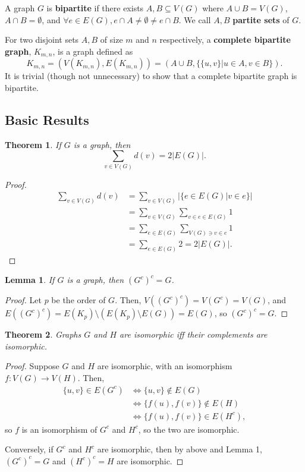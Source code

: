 \documentclass[a4paper,12pt]{article}
\newtheorem{theorem}{Theorem}
\newtheorem{lemma}{Lemma}
\begin{document}
A graph $G$ is {\bf bipartite} if there exists $A, B \subseteq V(G)$ where
$A \cup B = V(G)$, $A \cap B = \emptyset$, and
$\forall e \in E(G), e \cap A \neq \emptyset \neq e \cap B$.
We call $A, B$ {\bf partite sets} of $G$.

For two disjoint sets $A, B$ of size $m$ and $n$ respectively,
a {\bf complete bipartite graph}, $K_{m,n}$, is a graph defined as
\[ K_{m,n} = (V(K_{m,n}), E(K_{m,n})) = (A \cup B, \{\{u, v\} | u \in A, v \in B\}).\]
It is trivial (though not unnecessary)
to show that a complete bipartite graph is bipartite.

\subsection{Basic Results}

\begin{theorem}
If $G$ is a graph, then
\[\sum_{v \in V(G)} d(v) = 2|E(G)|.\]
\end{theorem}

\begin{proof}
\begin{align*}
\sum_{v \in V(G)} d(v)
& = \sum_{v \in V(G)} |\{e \in E(G) | v \in e \}| \\
& = \sum_{v \in V(G)} \sum_{v \in e \in E(G)} 1 \\
& = \sum_{e \in E(G)} \sum_{V(G) \ni v \in e} 1 \\
& = \sum_{e \in E(G)} 2
= 2 |E(G)|.
\end{align*}
\end{proof}

\begin{lemma}
If $G$ is a graph, then $(G^c)^c = G$.
\end{lemma}

\begin{proof}
Let $p$ be the order of $G$. Then,
$V((G^c)^c) = V(G^c) = V(G)$, and
$E((G^c)^c) = E(K_p) \setminus (E(K_p) \setminus E(G)) = E(G)$, so
$(G^c)^c = G$.
\end{proof}

\begin{theorem}
Graphs $G$ and $H$ are isomorphic iff their complements are isomorphic.
\end{theorem}

\begin{proof}
Suppose $G$ and $H$ are isomorphic, with an isomorphism $f : V(G) \to V(H)$.
Then,
\begin{align*}
\{u, v\} \in E(G^c)
& \iff \{u, v\} \not\in E(G) \\
& \iff \{f(u), f(v)\} \not\in E(H) \\
& \iff \{f(u), f(v)\} \in E(H^c),
\end{align*}
so $f$ is an isomorphism of $G^c$ and $H^c$, so the two are isomorphic.

Conversely, if $G^c$ and $H^c$ are isomorphic, then by above and Lemma 1,
$(G^c)^c = G$ and $(H^c)^c = H$ are isomorphic.
\end{proof}
\end{document}
